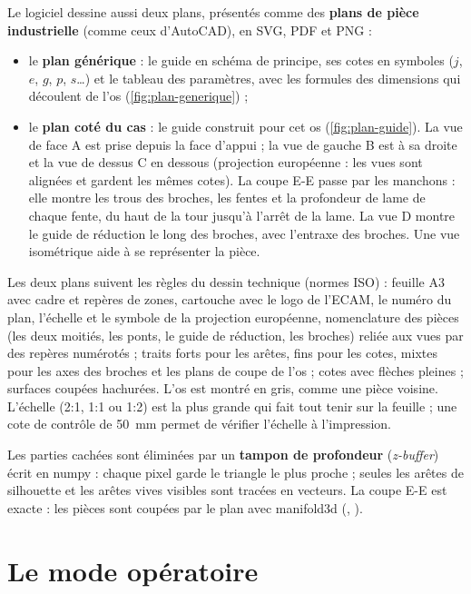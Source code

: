 Le logiciel dessine aussi deux plans, présentés comme des \textbf{plans de pièce industrielle} (comme ceux d'AutoCAD),
en SVG, PDF et PNG :
\begin{itemize}
  \item le \textbf{plan générique} : le guide en schéma de principe, ses cotes en symboles ($j$, $e$, $g$, $p$,
  $s$\ldots) et le tableau des paramètres, avec les formules des dimensions qui découlent de l'os
  (\cref{fig:plan-generique}) ;
  \item le \textbf{plan coté du cas} : le guide construit pour cet os (\cref{fig:plan-guide}). La vue de face A est
  prise depuis la face d'appui ; la vue de gauche B est à sa droite et la vue de dessus C en dessous (projection
  européenne : les vues sont alignées et gardent les mêmes cotes). La coupe E-E passe par les manchons : elle montre
  les trous des broches, les fentes et la profondeur de lame de chaque fente, du haut de la tour jusqu'à l'arrêt de la
  lame. La vue D montre le guide de réduction le long des broches, avec l'entraxe des broches. Une vue isométrique aide
  à se représenter la pièce.
\end{itemize}
Les deux plans suivent les règles du dessin technique (normes ISO) : feuille A3 avec cadre et repères de zones,
cartouche avec le logo de l'ECAM, le numéro du plan, l'échelle et le symbole de la projection européenne, nomenclature
des pièces (les deux moitiés, les ponts, le guide de réduction, les broches) reliée aux vues par des repères numérotés ;
traits forts pour les arêtes, fins pour les cotes, mixtes pour les axes des broches et les plans de coupe de l'os ;
cotes avec flèches pleines ; surfaces coupées hachurées. L'os est montré en gris, comme une pièce voisine. L'échelle
(2:1, 1:1 ou 1:2) est la plus grande qui fait tout tenir sur la feuille ; une cote de contrôle de 50~mm permet de
vérifier l'échelle à l'impression.

Les parties cachées sont éliminées par un \textbf{tampon de profondeur} (\emph{z-buffer}) écrit en numpy : chaque pixel
garde le triangle le plus proche ; seules les arêtes de silhouette et les arêtes vives visibles sont tracées en
vecteurs. La coupe E-E est exacte : les pièces sont coupées par le plan avec manifold3d (,
).

\section{Le mode opératoire}
\label{sec:protocole}

